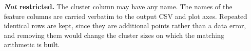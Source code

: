\documentclass[a4paper,11pt]{article}
\begin{document}
\vspace{0.4em}
\noindent\textbf{\emph{Not} restricted.} The cluster column may have any name. The names of the feature columns are carried verbatim to the output CSV and plot axes. Repeated identical rows are kept, since they are additional points rather than a data error, and removing them would change the cluster sizes on which the matching arithmetic is built.

\end{document}
